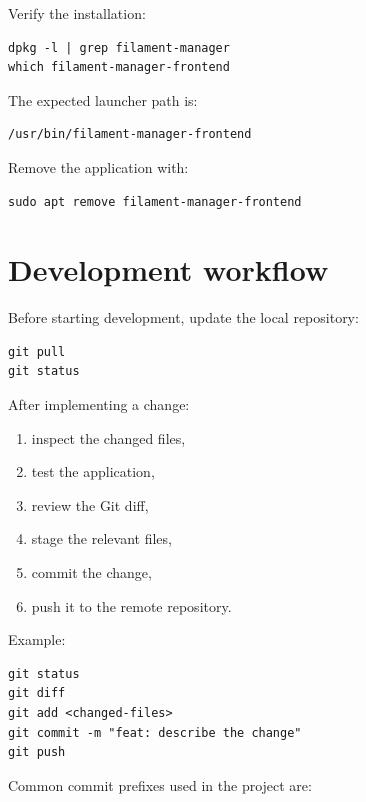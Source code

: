 \documentclass[a4paper,11pt]{article}
\begin{document}
Verify the installation:

\begin{lstlisting}
dpkg -l | grep filament-manager
which filament-manager-frontend
\end{lstlisting}

The expected launcher path is:

\begin{lstlisting}
/usr/bin/filament-manager-frontend
\end{lstlisting}

Remove the application with:

\begin{lstlisting}
sudo apt remove filament-manager-frontend
\end{lstlisting}

\section{Development workflow}

Before starting development, update the local repository:

\begin{lstlisting}
git pull
git status
\end{lstlisting}

After implementing a change:

\begin{enumerate}
  \item inspect the changed files,
  \item test the application,
  \item review the Git diff,
  \item stage the relevant files,
  \item commit the change,
  \item push it to the remote repository.
\end{enumerate}

Example:

\begin{lstlisting}
git status
git diff
git add <changed-files>
git commit -m "feat: describe the change"
git push
\end{lstlisting}

Common commit prefixes used in the project are:
\end{document}
